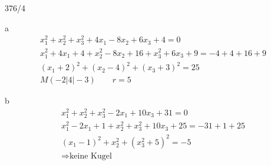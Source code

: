 \newpage
\begin{exercise}{376/4}
  \item [a]
  \begin{gather*}
    x_1^2 + x_2^2 + x_3^2 + 4x_1 - 8x_2 + 6x_3 + 4 = 0 \\
    x_1^2 + 4x_1 + 4 + x_2^2 - 8x_2 + 16 + x_3^2 + 6x_3 + 9 = -4 + 4 + 16 + 9 \\
    (x_1 + 2)^2 + (x_2 - 4)^2 + (x_3 + 3)^2 = 25 \\
    M(-2|4|-3) \qquad r = 5
  \end{gather*}
  \item [b]
  \begin{gather*}
    x_1^2 + x_2^2 + x_3^2 - 2x_1 + 10x_3 + 31 = 0 \\
    x_1^2 - 2x_1 + 1 + x_2^2 + x_3^2 + 10x_3 + 25 = -31 + 1 + 25 \\
    (x_1 - 1)^2 + x_2^2 + (x_3^2 + 5)^2 = -5 \\
    \Rightarrow \text{keine Kugel}
  \end{gather*}
\end{exercise}
